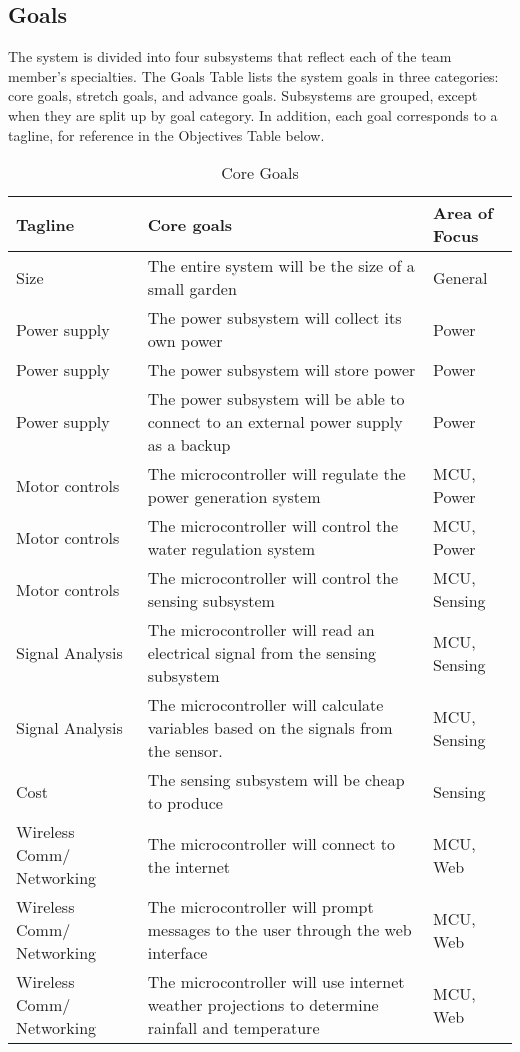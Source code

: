 \subsection{Goals}

The system is divided into four subsystems that reflect each of the team member’s specialties. The Goals Table lists the system goals in three categories: core goals, stretch goals, and advance goals. Subsystems are grouped, except when they are split up by goal category. In addition, each goal corresponds to a tagline, for reference in the Objectives Table below.


\begin{table}[H]
  \centering
  \begin{tabular}{|p{3cm}|p{7cm}|p{3cm}|}
    \hline
    Tagline & Core goals & Area of Focus \\
    \hline
    Size & The entire system will be the size of a small garden & General\\
    \hline
    Power supply & The power subsystem will collect its own power	& Power\\
    \hline
    Power supply & The power subsystem will store power	& Power\\
    \hline
    Power supply & The power subsystem will be able to connect to an external power supply as a backup & Power\\
    \hline
    Motor controls & The microcontroller will regulate the power generation system & MCU, Power\\
    \hline
    Motor controls & The microcontroller will control the water regulation system & MCU, Power\\
    \hline
    Motor controls & The microcontroller will control the sensing subsystem & MCU, Sensing\\
    \hline
    Signal Analysis & The microcontroller will read an electrical signal from the sensing subsystem & MCU, Sensing\\
    \hline
    Signal Analysis & The microcontroller will calculate variables based on the signals from the sensor. & MCU, Sensing\\
    \hline
    Cost & The sensing subsystem will be cheap to produce & Sensing\\
    \hline
    Wireless Comm/ Networking & The microcontroller will connect to the internet & MCU, Web\\
    \hline
    Wireless Comm/ Networking & The microcontroller will prompt messages to the user through the web interface & MCU, Web\\
    \hline
    Wireless Comm/ Networking & The microcontroller will use internet weather projections to determine rainfall and temperature & MCU, Web\\
    \hline
  \end{tabular}
  \label{table:CoreGoals}
  \caption{Core Goals}
\end{table}

